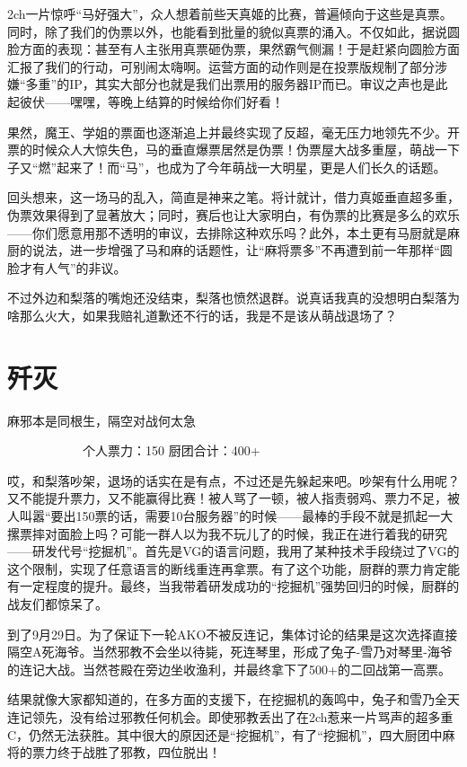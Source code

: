 2ch一片惊呼“马好强大”，众人想着前些天真姬的比赛，普遍倾向于这些是真票。同时，除了我们的伪票以外，也能看到批量的貌似真票的涌入。不仅如此，据说圆脸方面的表现：甚至有人主张用真票砸伪票，果然霸气侧漏！于是赶紧向圆脸方面汇报了我们的行动，可别闹太嗨啊。运营方面的动作则是在投票版规制了部分涉嫌“多重”的IP，其实大部分也就是我们出票用的服务器IP而已。审议之声也是此起彼伏——嘿嘿，等晚上结算的时候给你们好看！

果然，魔王、学姐的票面也逐渐追上并最终实现了反超，毫无压力地领先不少。开票的时候众人大惊失色，马的垂直爆票居然是伪票！伪票屋大战多重屋，萌战一下子又“燃”起来了！而“马”，也成为了今年萌战一大明星，更是人们长久的话题。

回头想来，这一场马的乱入，简直是神来之笔。将计就计，借力真姬垂直超多重，伪票效果得到了显著放大；同时，赛后也让大家明白，有伪票的比赛是多么的欢乐——你们愿意用那不透明的审议，去排除这种欢乐吗？此外，本土更有马厨就是麻厨的说法，进一步增强了马和麻的话题性，让“麻将票多”不再遭到前一年那样“圆脸才有人气”的非议。

不过外边和梨落的嘴炮还没结束，梨落也愤然退群。说真话我真的没想明白梨落为啥那么火大，如果我赔礼道歉还不行的话，我是不是该从萌战退场了？


\section{歼灭}
麻邪本是同根生，隔空对战何太急

　　　　　　个人票力：150 厨团合计：400+

哎，和梨落吵架，退场的话实在是有点，不过还是先躲起来吧。吵架有什么用呢？又不能提升票力，又不能赢得比赛！被人骂了一顿，被人指责弱鸡、票力不足，被人叫嚣“要出150票的话，需要10台服务器”的时候——最棒的手段不就是抓起一大摞票摔对面脸上吗？可能一群人以为我不玩儿了的时候，我正在进行着我的研究——研发代号“挖掘机”。首先是VG的语言问题，我用了某种技术手段绕过了VG的这个限制，实现了任意语言的断线重连再拿票。有了这个功能，厨群的票力肯定能有一定程度的提升。最终，当我带着研发成功的“挖掘机”强势回归的时候，厨群的战友们都惊呆了。

到了9月29日。为了保证下一轮AKO不被反连记，集体讨论的结果是这次选择直接隔空A死海爷。当然邪教不会坐以待毙，死连琴里，形成了兔子-雪乃对琴里-海爷的连记大战。当然苍殿在旁边坐收渔利，并最终拿下了500+的二回战第一高票。

结果就像大家都知道的，在多方面的支援下，在挖掘机的轰鸣中，兔子和雪乃全天连记领先，没有给过邪教任何机会。即使邪教丢出了在2ch惹来一片骂声的超多重C，仍然无法获胜。其中很大的原因还是“挖掘机”，有了“挖掘机”，四大厨团中麻将的票力终于战胜了邪教，四位脱出！

